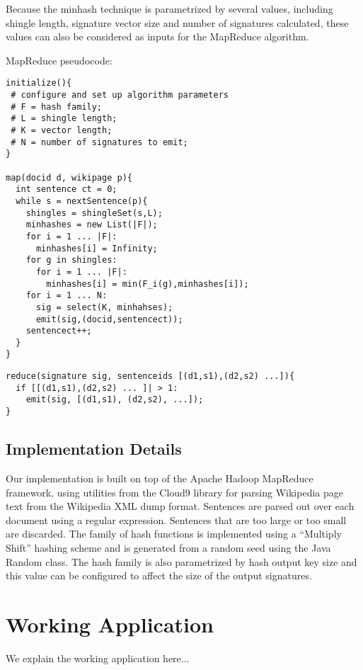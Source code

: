 \documentclass{acm_proc_article-sp}
\begin{document}
Because the minhash technique is parametrized by several values, including shingle length, signature vector size and number of signatures calculated, these values can also be considered as inputs for the MapReduce algorithm.

\begin{table}
MapReduce pseudocode:
\begin{verbatim}
initialize(){
 # configure and set up algorithm parameters
 # F = hash family;
 # L = shingle length;
 # K = vector length;
 # N = number of signatures to emit;
}

map(docid d, wikipage p){
  int sentence ct = 0;
  while s = nextSentence(p){
    shingles = shingleSet(s,L);
    minhashes = new List(|F|);
    for i = 1 ... |F|:
      minhashes[i] = Infinity;
    for g in shingles:
      for i = 1 ... |F|:
        minhashes[i] = min(F_i(g),minhashes[i]);
    for i = 1 ... N:
      sig = select(K, minhahses);
      emit(sig,(docid,sentencect));
    sentencect++;
  }
}
\end{verbatim}

\begin{verbatim}
reduce(signature sig, sentenceids [(d1,s1),(d2,s2) ...]){
  if [[(d1,s1),(d2,s2) ... ]| > 1:
    emit(sig, [(d1,s1), (d2,s2), ...]);
}
\end{verbatim}
\end{table}

\subsection{Implementation Details}

Our implementation is built on top of the Apache Hadoop MapReduce framework, using utilities from the Cloud9 library for parsing Wikipedia page text from the Wikipedia XML dump format. Sentences are parsed out over each document using a regular expression. Sentences that are too large or too small are discarded. The family of hash functions is implemented using a ``Multiply Shift''  \cite{} hashing scheme and is generated from a random seed using the Java Random class. The hash family is also parametrized by hash output key size and this value can be configured to affect the size of the output signatures.

\section{Working Application}
We explain the working application here...
\end{document}
